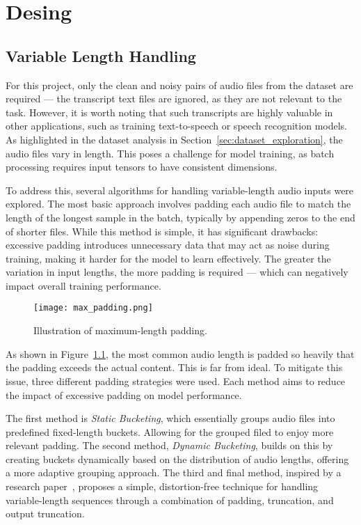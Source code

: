 \graphicspath{{content/chapters/5_design/figures/}}
\chapter{Desing}
\label{chp:design}

\section{Variable Length Handling}
\label{sec:variable_length_handling}

For this project, only the clean and noisy pairs of audio files from the dataset are required — the transcript text files are ignored, as they are not relevant to the task. However, it is worth noting that such transcripts are highly valuable in other applications, such as training text-to-speech or speech recognition models. As highlighted in the dataset analysis in Section~\ref{sec:dataset_exploration}, the audio files vary in length. This poses a challenge for model training, as batch processing requires input tensors to have consistent dimensions.

To address this, several algorithms for handling variable-length audio inputs were explored. The most basic approach involves padding each audio file to match the length of the longest sample in the batch, typically by appending zeros to the end of shorter files. While this method is simple, it has significant drawbacks: excessive padding introduces unnecessary data that may act as noise during training, making it harder for the model to learn effectively. The greater the variation in input lengths, the more padding is required — which can negatively impact overall training performance.

\begin{figure}[h]
    \centering
    \texttt{[image: max\_padding.png]}
    \caption{\label{fig:max_padding}Illustration of maximum-length padding.}
\end{figure}

As shown in Figure~\ref{fig:max_padding}, the most common audio length is padded so heavily that the padding exceeds the actual content. This is far from ideal. To mitigate this issue, three different padding strategies were used. Each method aims to reduce the impact of excessive padding on model performance.

The first method is \textit{Static Bucketing}, which essentially groups audio files into predefined fixed-length buckets. Allowing for the grouped filed to enjoy more relevant padding. The second method, \textit{Dynamic Bucketing}, builds on this by creating buckets dynamically based on the distribution of audio lengths, offering a more adaptive grouping approach. The third and final method, inspired by a research paper~\cite{yoon2020pto}, proposes a simple, distortion-free technique for handling variable-length sequences through a combination of padding, truncation, and output truncation.

